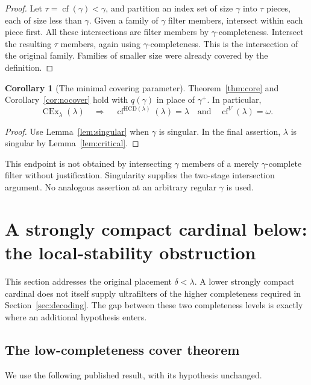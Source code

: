\documentclass[11pt,letterpaper]{article}
\theoremstyle{definition}
\newtheorem{corollary}[definition]{Corollary}
\newcommand{\CEx}{\operatorname{CEx}}
\newcommand{\cf}{\operatorname{cf}}
\newcommand{\HCD}{\mathrm{HCD}}
\begin{document}
\begin{proof}
Let $\tau=\cf(\gamma)<\gamma$, and partition an index set of size $\gamma$ into $\tau$ pieces, each of size less than $\gamma$. Given a family of $\gamma$ filter members, intersect within each piece first. All these intersections are filter members by $\gamma$-completeness. Intersect the resulting $\tau$ members, again using $\gamma$-completeness. This is the intersection of the original family. Families of smaller size were already covered by the definition.
\end{proof}

\begin{corollary}[The minimal covering parameter]\label{cor:minimal}
Theorem~\ref{thm:core} and Corollary~\ref{cor:nocover} hold with $q(\gamma)$ in place of $\gamma^+$. In particular,
\[
 \CEx_\lambda(\lambda)
 \quad\Longrightarrow\quad
 \cf^{\HCD(\lambda)}(\lambda)=\lambda
 \quad\text{and}\quad \cf^V(\lambda)=\omega.
\]
\end{corollary}

\begin{proof}
Use Lemma~\ref{lem:singular} when $\gamma$ is singular. In the final assertion, $\lambda$ is singular by Lemma~\ref{lem:critical}.
\end{proof}

This endpoint is not obtained by intersecting $\gamma$ members of a merely $\gamma$-complete filter without justification. Singularity supplies the two-stage intersection argument. No analogous assertion at an arbitrary regular $\gamma$ is used.

\section{A strongly compact cardinal below: the local-stability obstruction}\label{sec:below}

This section addresses the original placement $\delta<\lambda$. A lower strongly compact cardinal does not itself supply ultrafilters of the higher completeness required in Section~\ref{sec:decoding}. The gap between these two completeness levels is exactly where an additional hypothesis enters.

\subsection{The low-completeness cover theorem}

We use the following published result, with its hypothesis unchanged.
\end{document}
